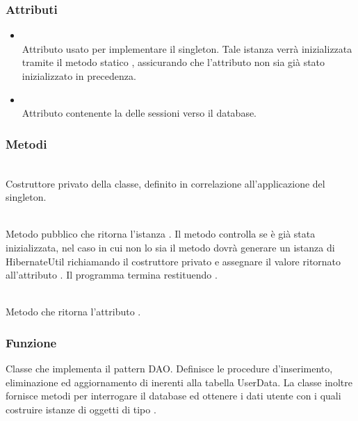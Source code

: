 \subsubsection*{Attributi}

\begin{itemize}
	\item{}\\
	Attributo usato per implementare il  singleton. Tale istanza verrà inizializzata tramite il metodo statico , assicurando che l'attributo non sia già stato inizializzato in precedenza.
	\item{}\\
	Attributo contenente la  delle sessioni verso il database.
\end{itemize}

\subsubsection*{Metodi}

\begin{description}
	\item{}\\
	Costruttore privato della classe, definito  in correlazione all'applicazione del  singleton.
	\item{}\\
	Metodo pubblico che ritorna l'istanza . Il metodo controlla se  è già stata inizializzata, nel caso in cui non lo sia il metodo dovrà generare un istanza di HibernateUtil richiamando il costruttore privato  e assegnare il valore ritornato all'attributo . Il programma termina restituendo .
	\item{}\\
	Metodo che ritorna l'attributo .
\end{description}


\subsubsection*{Funzione}
Classe che implementa il pattern DAO. Definisce le procedure d'inserimento, eliminazione ed aggiornamento di  inerenti alla tabella UserData. La classe inoltre fornisce metodi per interrogare il database ed ottenere i dati utente con i quali costruire istanze di oggetti di tipo .

